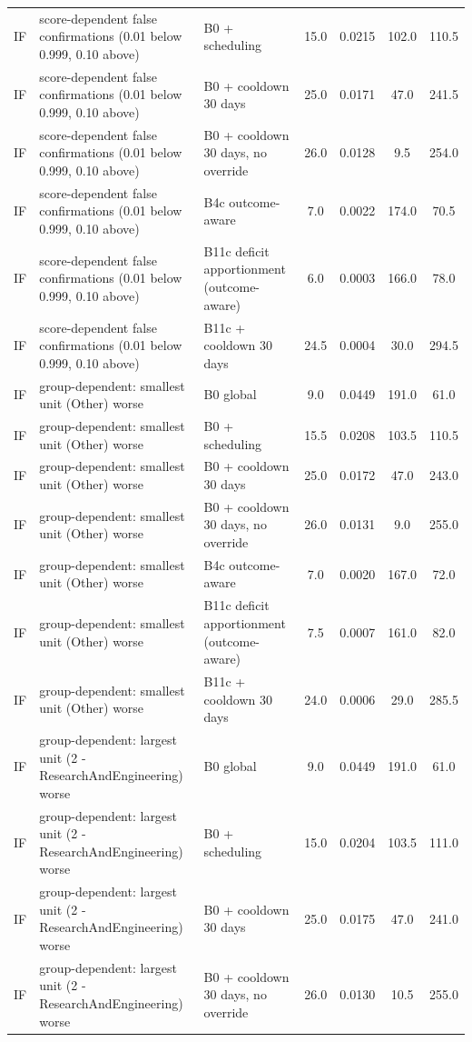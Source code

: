 \documentclass[10pt,onecolumn,letterpaper]{article}
\begin{document}
\begin{longtable}{lp{5.2cm}p{4.4cm}cccc}
IF & score-dependent false confirmations (0.01 below 0.999, 0.10 above) & B0 + scheduling & 15.0 & 0.0215 & 102.0 & 110.5 \\
IF & score-dependent false confirmations (0.01 below 0.999, 0.10 above) & B0 + cooldown 30 days & 25.0 & 0.0171 & 47.0 & 241.5 \\
IF & score-dependent false confirmations (0.01 below 0.999, 0.10 above) & B0 + cooldown 30 days, no override & 26.0 & 0.0128 & 9.5 & 254.0 \\
IF & score-dependent false confirmations (0.01 below 0.999, 0.10 above) & B4c outcome-aware & 7.0 & 0.0022 & 174.0 & 70.5 \\
IF & score-dependent false confirmations (0.01 below 0.999, 0.10 above) & B11c deficit apportionment (outcome-aware) & 6.0 & 0.0003 & 166.0 & 78.0 \\
IF & score-dependent false confirmations (0.01 below 0.999, 0.10 above) & B11c + cooldown 30 days & 24.5 & 0.0004 & 30.0 & 294.5 \\
IF & group-dependent: smallest unit (Other) worse & B0 global & 9.0 & 0.0449 & 191.0 & 61.0 \\
IF & group-dependent: smallest unit (Other) worse & B0 + scheduling & 15.5 & 0.0208 & 103.5 & 110.5 \\
IF & group-dependent: smallest unit (Other) worse & B0 + cooldown 30 days & 25.0 & 0.0172 & 47.0 & 243.0 \\
IF & group-dependent: smallest unit (Other) worse & B0 + cooldown 30 days, no override & 26.0 & 0.0131 & 9.0 & 255.0 \\
IF & group-dependent: smallest unit (Other) worse & B4c outcome-aware & 7.0 & 0.0020 & 167.0 & 72.0 \\
IF & group-dependent: smallest unit (Other) worse & B11c deficit apportionment (outcome-aware) & 7.5 & 0.0007 & 161.0 & 82.0 \\
IF & group-dependent: smallest unit (Other) worse & B11c + cooldown 30 days & 24.0 & 0.0006 & 29.0 & 285.5 \\
IF & group-dependent: largest unit (2 - ResearchAndEngineering) worse & B0 global & 9.0 & 0.0449 & 191.0 & 61.0 \\
IF & group-dependent: largest unit (2 - ResearchAndEngineering) worse & B0 + scheduling & 15.0 & 0.0204 & 103.5 & 111.0 \\
IF & group-dependent: largest unit (2 - ResearchAndEngineering) worse & B0 + cooldown 30 days & 25.0 & 0.0175 & 47.0 & 241.0 \\
IF & group-dependent: largest unit (2 - ResearchAndEngineering) worse & B0 + cooldown 30 days, no override & 26.0 & 0.0130 & 10.5 & 255.0 \\

\end{longtable}
\end{document}
